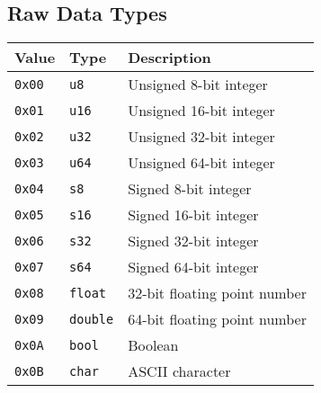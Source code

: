 \documentclass[a4paper]{article}
\begin{document}
\subsection{Raw Data Types}
\begin{longtable}{@{}lll@{}}
\toprule
Value    & Type             & Description                  \\
\midrule
\texttt{0x00} & \texttt{u8}       & Unsigned 8-bit integer       \\
\texttt{0x01} & \texttt{u16}      & Unsigned 16-bit integer      \\
\texttt{0x02} & \texttt{u32}      & Unsigned 32-bit integer      \\
\texttt{0x03} & \texttt{u64}      & Unsigned 64-bit integer      \\
\texttt{0x04} & \texttt{s8}       & Signed 8-bit integer         \\
\texttt{0x05} & \texttt{s16}      & Signed 16-bit integer        \\
\texttt{0x06} & \texttt{s32}      & Signed 32-bit integer        \\
\texttt{0x07} & \texttt{s64}      & Signed 64-bit integer        \\
\texttt{0x08} & \texttt{float}    & 32-bit floating point number \\
\texttt{0x09} & \texttt{double}   & 64-bit floating point number \\
\texttt{0x0A} & \texttt{bool}     & Boolean                      \\
\texttt{0x0B} & \texttt{char}     & ASCII character              \\
\bottomrule
\end{longtable}
\end{document}
